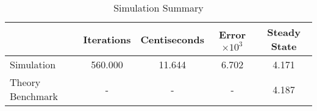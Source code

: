 \begin{table}[htb]
\centering
\caption{Simulation Summary}
\label{table:psCp2:tab:sim2a}
\begin{tabular}{lcccc}
\hline
 & Iterations & Centiseconds & Error$\times 10^3$ & Steady State \\
\hline\hline
Simulation & 560.000 & 11.644 & 6.702 & 4.171 \\
Theory Benchmark & - & - & - & 4.187 \\
\hline
\end{tabular}
\end{table}
